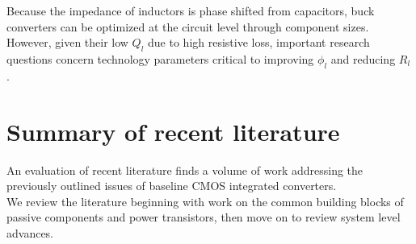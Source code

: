 \documentclass[letterpaper,twocolumn,10pt]{article}
\begin{document}
\indent Because the impedance of inductors is phase shifted from capacitors, buck converters can be optimized at the circuit level through component sizes. However, given their low $Q_l$ due to high resistive loss, important research questions concern technology parameters critical to improving $\phi_l$ and reducing $R_l$.\\    



\section{Summary of recent literature} \label{litReview}
An evaluation of recent literature finds a volume of work addressing the previously outlined issues of baseline CMOS integrated converters.\\
We review the literature beginning with work on the common building blocks of passive components and power transistors, then move on to review system level advances.\\ 
\end{document}
